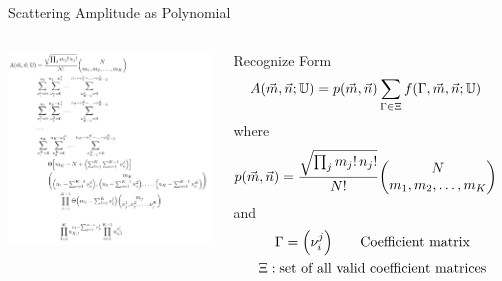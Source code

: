 
\begin{frame}{Scattering Amplitude as Polynomial}
%
\begin{columns}[t]
\vspace{-15pt}
\begin{center}
	\includegraphics[width=\linewidth]{./gfx/Amplitude-Exact}
\end{center}
%
Recognize Form
\begin{align*}
	A(\vec{m}, \vec{n}; \mathbb{U})
&=
	p(\vec{m}, \vec{n})
	\sum_{\Gamma \in \Xi}
		f(\Gamma, \vec{m}, \vec{n}; \mathbb{U})
\end{align*}
where
\begin{align*}
	p(\vec{m}, \vec{n})
&=
	\frac
		{\sqrt{\prod_j m_j! \, n_j!}}
		{N!}
	\mqty(
		N \\
		m_1, m_2, \ldots, m_K
	)
\end{align*}
and
\begin{gather*}
	\Gamma
=
	\qty( \nu_i^j )
\qquad
	\text{Coefficient matrix}
\\
	\Xi :
	\text{set of all valid coefficient matrices}
\end{gather*}
\end{columns}
%
\end{frame}


